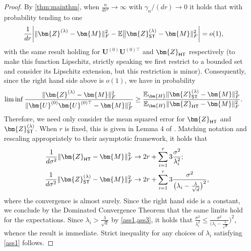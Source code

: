 \documentclass[10pt]{article}
\theoremstyle{definition}
\begin{document}
\begin{proof}
By \cref{thm:mainthm}, when $\frac{n}{dr^2} \to \infty$ with $\gamma_n/(dr) \to 0$ it holds that with probability tending to one
\begin{align*}
   \frac{1}{dr} \bigg| \| \bm{Z}^{(\lambda)} - \bm{M} \|_F^2 - \mathbb{E} \big\| \bm{Z}_{{\sf ST}}^{(\lambda)} - \bm{M} \|_F^2 \bigg| &= o(1), 
\end{align*}
with the same result holding for $\bm{U}^{(0)} \bm{U}^{(0)\top}$ and $\bm{Z}_{{\sf HT}}$ respectively (to make this function Lipschitz, strictly speaking we first restrict to a bounded set and consider its Lipschitz extension, but this restriction is minor).  Consequently, since the right hand side above is $o(1)$, we have in probability
\begin{align*}
\liminf \frac{\|\bm{Z}^{(\lambda)} - \bm{M}\|_F^2}{\| \bm{U}^{(0)} \bm{U}^{(0)\top} - \bm{M} \|_F^2} &\geq \frac{  \mathbb{E}_{\bm{H}} \| \bm{Z}_{{\sf ST}}^{(\lambda)} - \bm{M} \|_F^2 }{  \mathbb{E}_{\bm{H}} \| \bm{Z}_{{\sf HT}} - \bm{M} \|_F^2}.
\end{align*}
Therefore, we need only consider the mean squared error for $\bm{Z}_{{\sf HT}}$ and $\bm{Z}_{{\sf ST}}^{(\lambda)}$.  When $r$ is fixed, this is given in Lemma 4 of \citet{gavish_optimal_2014}.  Matching notation and rescaling appropriately to their asymptotic framework, it holds that
\begin{align*}
    \frac{1}{d \sigma^2 } \| \bm{Z}_{{\sf HT}} - \bm{M} \|_F^2 &\to 2r + \sum_{i=1}^{r} 3 \frac{\sigma^2}{\lambda_i^2}; \\
    \frac{1}{d \sigma^2} \| \bm{Z}_{{\sf ST}}^{(\lambda)} - \bm{M} \|_F^2 &\to 2r + \sum_{i=1}^{r} 3 \frac{\sigma^2}{\big( \lambda_i - \frac{\lambda}{\sqrt{d}} \big)^2},
\end{align*}
where the convergence is almost surely.  Since the right hand side is a constant, we conclude by the Dominated Convergence Theorem that the same limits hold for the expectations.   Since $\lambda_i > \frac{\lambda}{\sqrt{d}}$ by \cref{ass1,ass3}, it holds that $\frac{\sigma^2}{\lambda_i^2} \leq \frac{\sigma^2}{(\lambda_i - \frac{\lambda}{\sqrt{d}}})^2$, whence the result is immediate.  Strict inequality for any choices of $\lambda_i$ satisfying \cref{ass1} follows. 
\end{proof}



\end{document}
